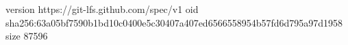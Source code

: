 version https://git-lfs.github.com/spec/v1
oid sha256:63a05bf7590b1bd10c0400e5c30407a407ed6566558954b57fd6d795a97d1958
size 87596
